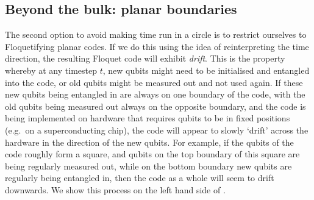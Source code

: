 

\subsection{Beyond the bulk: planar boundaries}\label{subsec:drift}

The second option to avoid making time run in a circle is to restrict ourselves to Floquetifying planar codes.
If we do this using the idea of reinterpreting the time direction, the resulting Floquet code will exhibit \textit{drift}.
This is the property whereby at any timestep $t$, new qubits might need to be initialised and entangled into the code,
or old qubits might be measured out and not used again.
If these new qubits being entangled in are always on one boundary of the code, with the old qubits being measured out always on the opposite boundary, and the code is being implemented on hardware that requires qubits to be in fixed positions (e.g.\ on a superconducting chip), the code will appear to slowly `drift' across the hardware in the direction of the new qubits.
For example, if the qubits of the code roughly form a square,
and qubits on the top boundary of this square are being regularly measured out,
while on the bottom boundary new qubits are regularly being entangled in,
then the code as a whole will seem to drift downwards.
We show this process on the left hand side of .

